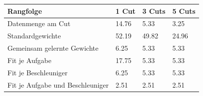 \begin{tabular}{@{}llll@{}}
\toprule
Rangfolge & 1 Cut & 3 Cuts & 5 Cuts \\
\midrule
Datenmenge am Cut & 14.76 & 5.33 & 3.25 \\
Standardgewichte & 52.19 & 49.82 & 24.96 \\
Gemeinsam gelernte Gewichte & 6.25 & 5.33 & 5.33 \\
Fit je Aufgabe & 17.75 & 5.33 & 5.33 \\
Fit je Beschleuniger & 6.25 & 5.33 & 5.33 \\
Fit je Aufgabe und Beschleuniger & 2.51 & 2.51 & 2.51 \\
\bottomrule
\end{tabular}
